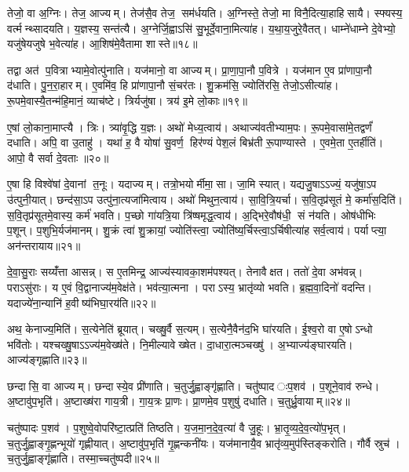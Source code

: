 तेजो॒ वा अ॒ग्निः। तेज॒ आज्यम्। तेज॑सै॒व तेज॒ सम॑र्धयति। अ॒ग्निस्ते॒ तेजो॒ मा विनै॒दित्या॒हाहिसायै। स्फ्यस्य॒ वर्त्मन्थ्सादयति। य॒ज्ञस्य॒ सन्त॑त्यै। अ॒ग्नेर्जि॒ह्वाऽसि॑ सु॒भूर्दे॒वाना॒मित्या॑ह। य॒था॒य॒जुरे॒वैतत्। धाम्ने॑धाम्ने दे॒वेभ्यो॒ यजु॑षेयजुषे भ॒वेत्या॑ह। आ॒शिष॑मे॒वैतामा शास्ते॥१८॥

तद्वा अत॑ प॒वित्राभ्यामे॒वोत्पु॑नाति। यज॑मानो॒ वा आज्यम्। प्रा॒णा॒पा॒नौ प॒वित्रे। यज॑मान ए॒व प्रा॑णापा॒नौ द॑धाति। पु॒न॒रा॒हारम्। ए॒वमि॑व॒ हि प्रा॑णापा॒नौ सं॒चर॑तः। शु॒क्रम॑सि॒ ज्योति॑रसि॒ तेजो॒ऽसीत्या॑ह। रू॒पमे॒वास्यै॒तन्म॑हि॒मानं॒ व्याच॑ष्टे। त्रिर्यजु॑षा। त्रय॑ इ॒मे लो॒काः॥१९॥

ए॒षां लो॒काना॒माप्त्यै। त्रिः। त्र्या॑वृ॒द्धि य॒ज्ञः। अथो॑ मेध्य॒त्वाय॑। अथाज्य॑वतीभ्याम॒पः। रू॒पमे॒वासा॑मे॒तद्वर्णं॑ दधाति। अपि॒ वा उ॒ताहु॑। यथा॑ ह॒ वै योषा॑ सु॒वर्ण॒ हिर॑ण्यं पेश॒लं बिभ्र॑ती रू॒पाण्यास्ते। ए॒वमे॒ता ए॒तर्\mbox{}हीति॑। आपो॒ वै सर्वा दे॒वताः॥२०॥

ए॒षा हि विश्वे॑षां दे॒वानां त॒नूः। यदाज्यम्। तत्रो॒भयोर्मीमा॒सा। जा॒मि स्यात्। यद्यजु॒षाऽऽज्यं॒ यजु॑षा॒ऽप उ॑त्पुनी॒यात्। छन्द॑सा॒ऽप उत्पु॑ना॒त्यजा॑मित्वाय। अथो॑ मिथुन॒त्वाय॑। सा॒वि॒त्रि॒यर्चा। स॒वि॒तृप्र॑सूतं मे॒ कर्मा॑स॒दिति॑। स॒वि॒तृप्र॑सूतमे॒वास्य॒ कर्म॑ भवति। प॒च्छो गा॑यत्रि॒या त्रि॑ष्षमृद्ध॒त्वाय॑। अ॒द्भिरे॒वौष॑धी॒ सं न॑यति। ओष॑धीभिः प॒शून्। प॒शुभि॒र्यज॑मानम्। शु॒क्रं त्वा॑ शु॒क्रायां॒ ज्योति॑स्त्वा॒ ज्योति॑ष्य॒र्चिस्त्वा॒ऽर्चिषीत्या॑ह सर्व॒त्वाय॑। पर्याप्त्या॒ अन॑न्तरायाय॥२१॥\anuvakamend[ई॒क्ष॒त॒ आ॒ह॒ शा॒स्ते॒ लो॒का दे॒वता॑ भवति॒ षट् च॑]

दे॒वा॒सु॒राः सय्यँ॑त्ता आसन्न्। स ए॒तमिन्द्र॒ आज्य॑स्यावका॒शम॑पश्यत्। तेनावैक्षत। ततो॑ दे॒वा अभ॑वन्न्। पराऽसु॑राः। य ए॒वं वि॒द्वानाज्य॑म॒वेक्ष॑ते। भव॑त्या॒त्मना। पराऽस्य॒ भ्रातृ॑व्यो भवति। ब्र॒ह्म॒वा॒दिनो॑ वदन्ति। यदाज्ये॑ना॒न्यानि॑ ह॒वीष्य॑भिघा॒रय॑ति॥२२॥

अथ॒ केनाज्य॒मिति॑। स॒त्येनेति॑ ब्रूयात्। चख्षु॒र्वै स॒त्यम्। स॒त्येनै॒वैन॑द॒भि घा॑रयति। ई॒श्व॒रो वा ए॒षोऽन्धो भवि॑तोः। यश्चख्षु॒षाऽऽज्य॑म॒वेख्ष॑ते। नि॒मील्यावेख्षेत। दा॒धारा॒त्मञ्चख्षु॑। अ॒भ्याज्य॑ङ्घारयति। आज्य॑ङ्गृह्णाति॥२३॥

छन्दासि॒ वा आज्यम्। छन्दास्ये॒व प्री॑णाति। च॒तुर्जु॒ह्वाङ्गृ॑ह्णाति। चतु॑ष्पाद ःप॒शव॑। प॒शूने॒वाव॑ रुन्धे। अ॒ष्टावु॑प॒भृति॑। अ॒ष्टाख्ष॑रा गाय॒त्री। गा॒य॒त्रः प्रा॒णः। प्रा॒णमे॒व प॒शुषु॑ दधाति। च॒तुर्ध्रु॒वायाम्॥२४॥

चतु॑ष्पादः प॒शव॑। प॒शुष्वे॒वोपरि॑ष्टा॒त्प्रति॑ तिष्ठति। य॒ज॒मा॒न॒दे॒व॒त्या॑ वै जु॒हूः। भ्रा॒तृ॒व्य॒दे॒व॒त्यो॑प॒भृत्। च॒तुर्जु॒ह्वाङ्गृ॒ह्णन्भूयो॑ गृह्णीयात्। अ॒ष्टावु॑प॒भृति॑ गृ॒ह्णन्कनी॑यः। यज॑मानायै॒व भ्रातृ॑व्य॒मुप॑स्तिङ्करोति। गौर्वै स्रुच॑। च॒तुर्जु॒ह्वाङ्गृ॑ह्णाति। तस्मा॒च्चतु॑ष्पदी॥२५॥

